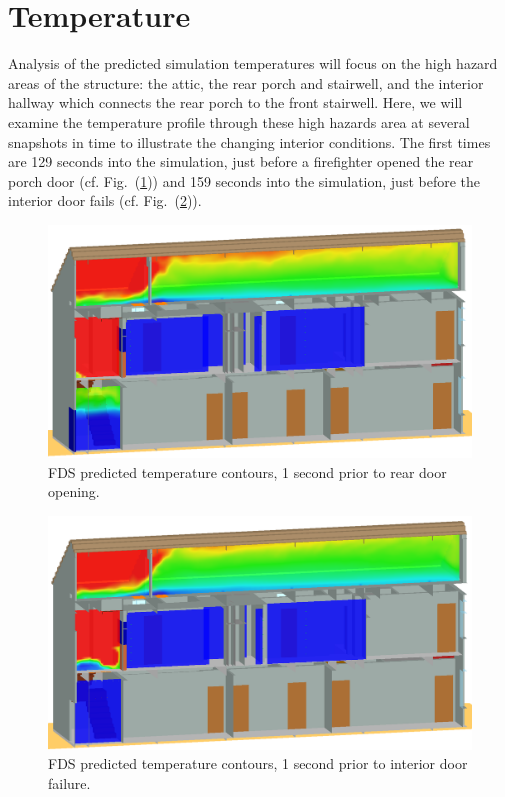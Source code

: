 \documentclass[11pt,oneside]{book}
\begin{document}
\section{Temperature}
\label{temp}
Analysis of the predicted simulation temperatures will focus on the high hazard areas of the structure: the attic, the rear porch and stairwell, and the interior hallway which connects the rear porch to the front stairwell. Here, we will examine the temperature profile through these high hazards area at several snapshots in time to illustrate the changing interior conditions. The first times are 129 seconds into the simulation, just before a firefighter opened the rear porch door (cf. Fig.~(\ref{fig:temp_129s})) and 159 seconds into the simulation, just before the interior door fails (cf. Fig.~(\ref{fig:temp_159s})).

\begin{figure}[!ht]
\includegraphics[width=.675\textwidth]{../Figures/west_50th_baseline_129}
 

\caption{FDS predicted temperature contours, 1 second prior to rear door opening.}
\label{fig:temp_129s}
\end{figure}

\begin{figure}[!ht]
\includegraphics[width=.675\textwidth]{../Figures/west_50th_baseline_159}
 

\caption{FDS predicted temperature contours, 1 second prior to interior door failure.}
\label{fig:temp_159s}
\end{figure}
\end{document}
